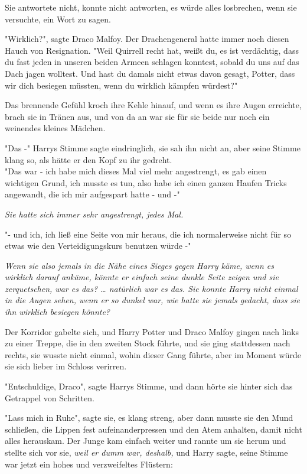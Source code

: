 {Sie antwortete nicht, konnte nicht antworten, es würde alles losbrechen, wenn sie versuchte, ein Wort zu sagen.

"Wirklich?", sagte Draco Malfoy. Der Drachengeneral hatte immer noch diesen Hauch von Resignation. "Weil Quirrell recht hat, weißt du, es ist verdächtig, dass du fast jeden in unseren beiden Armeen schlagen konntest, sobald du uns auf das Dach jagen wolltest. Und hast du damals nicht etwas davon gesagt, Potter, dass wir dich besiegen müssten, wenn du wirklich kämpfen würdest?"

Das brennende Gefühl kroch ihre Kehle hinauf, und wenn es ihre Augen erreichte, brach sie in Tränen aus, und von da an war sie für sie beide nur noch ein weinendes kleines Mädchen.

"Das -" Harrys Stimme sagte eindringlich, sie sah ihn nicht an, aber seine Stimme klang so, als hätte er den Kopf zu ihr gedreht.\\ "Das war - ich habe mich dieses Mal viel mehr angestrengt, es gab einen wichtigen Grund, ich musste es tun, also habe ich einen ganzen Haufen Tricks angewandt, die ich mir aufgespart hatte - und -"

\emph{Sie hatte sich immer sehr angestrengt, jedes Mal.}

"- und ich, ich ließ eine Seite von mir heraus, die ich normalerweise nicht für so etwas wie den Verteidigungskurs benutzen würde -"

\emph{Wenn sie also jemals in die Nähe eines Sieges gegen Harry käme, wenn es wirklich darauf ankäme, könnte er einfach seine dunkle Seite zeigen und sie zerquetschen, war es das? … natürlich war es das. Sie konnte Harry nicht einmal in die Augen sehen, wenn er so dunkel war, wie hatte sie jemals gedacht, dass sie ihn wirklich besiegen könnte?}

Der Korridor gabelte sich, und Harry Potter und Draco Malfoy gingen nach links zu einer Treppe, die in den zweiten Stock führte, und sie ging stattdessen nach rechts, sie wusste nicht einmal, wohin dieser Gang führte, aber im Moment würde sie sich lieber im Schloss verirren.

"Entschuldige, Draco", sagte Harrys Stimme, und dann hörte sie hinter sich das Getrappel von Schritten.

"Lass mich in Ruhe", sagte sie, es klang streng, aber dann musste sie den Mund schließen, die Lippen fest aufeinanderpressen und den Atem anhalten, damit nicht alles herauskam. Der Junge kam einfach weiter und rannte um sie herum und stellte sich vor sie, \emph{weil er dumm war, deshalb,} und Harry sagte, seine Stimme\\ war jetzt ein hohes und verzweifeltes Flüstern:

}
